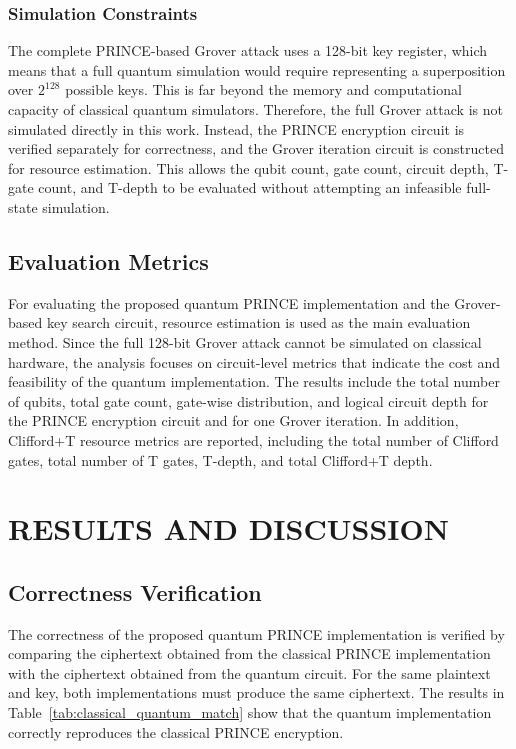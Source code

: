 \documentclass[12pt,a4paper]{report}
\begin{document}
\subsection{Simulation Constraints}

The complete PRINCE-based Grover attack uses a 128-bit key register, which means that a full quantum simulation would require representing a superposition over $2^{128}$ possible keys. This is far beyond the memory and computational capacity of classical quantum simulators. Therefore, the full Grover attack is not simulated directly in this work. Instead, the PRINCE encryption circuit is verified separately for correctness, and the Grover iteration circuit is constructed for resource estimation. This allows the qubit count, gate count, circuit depth, T-gate count, and T-depth to be evaluated without attempting an infeasible full-state simulation.


\section{Evaluation Metrics}

For evaluating the proposed quantum PRINCE implementation and the Grover-based key search circuit, resource estimation is used as the main evaluation method. Since the full 128-bit Grover attack cannot be simulated on classical hardware, the analysis focuses on circuit-level metrics that indicate the cost and feasibility of the quantum implementation. The results include the total number of qubits, total gate count, gate-wise distribution, and logical circuit depth for the PRINCE encryption circuit and for one Grover iteration. In addition, Clifford+T resource metrics are reported, including the total number of Clifford gates, total number of T gates, T-depth, and total Clifford+T depth. 




\chapter{RESULTS AND DISCUSSION}

\section{Correctness Verification}

The correctness of the proposed quantum PRINCE implementation is verified by comparing the ciphertext obtained from the classical PRINCE implementation with the ciphertext obtained from the quantum circuit. For the same plaintext and key, both implementations must produce the same ciphertext. The results in Table~\ref{tab:classical_quantum_match} show that the quantum implementation correctly reproduces the classical PRINCE encryption.
\end{document}
